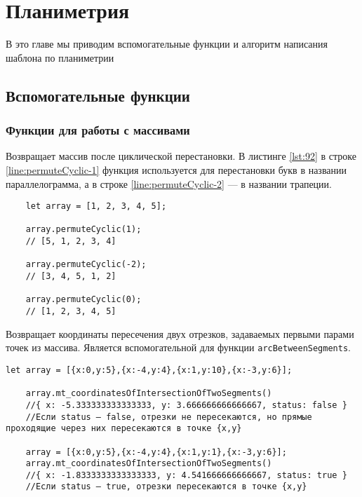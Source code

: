 
\section{Планиметрия}
В это главе мы приводим вспомогательные функции и алгоритм написания шаблона по планиметрии
\subsection{Вспомогательные функции}
\subsubsection{Функции для работы с массивами}
Возвращает массив после циклической перестановки.
В листинге \ref{lst:92} в строке \ref{line:permuteCyclic-1} функция используется для перестановки букв в названии параллелограмма, а в строке \ref{line:permuteCyclic-2} — в названии трапеции.

\begin{lstlisting}
    let array = [1, 2, 3, 4, 5];

    array.permuteCyclic(1);
    // [5, 1, 2, 3, 4]

    array.permuteCyclic(-2);
    // [3, 4, 5, 1, 2]

    array.permuteCyclic(0);
    // [1, 2, 3, 4, 5]
    \end{lstlisting}

Возвращает координаты пересечения двух отрезков, задаваемых первыми парами точек из массива. Является вспомогательной для функции \texttt{arcBetweenSegments}.

\begin{lstlisting}[escapechar=|]
    let array = [{x:0,y:5},{x:-4,y:4},{x:1,y:10},{x:-3,y:6}];

    array.mt_coordinatesOfIntersectionOfTwoSegments()
    //{ x: -5.333333333333333, y: 3.666666666666667, status: false }
    //Если status — false, отрезки не пересекаются, но прямые проходящие через них пересекаются в точке {x,y}

    array = [{x:0,y:5},{x:-4,y:4},{x:1,y:1},{x:-3,y:6}];
    array.mt_coordinatesOfIntersectionOfTwoSegments()
    //{ x: -1.8333333333333333, y: 4.541666666666667, status: true }
    //Если status — true, отрезки пересекаются в точке {x,y}
        
\end{lstlisting}

